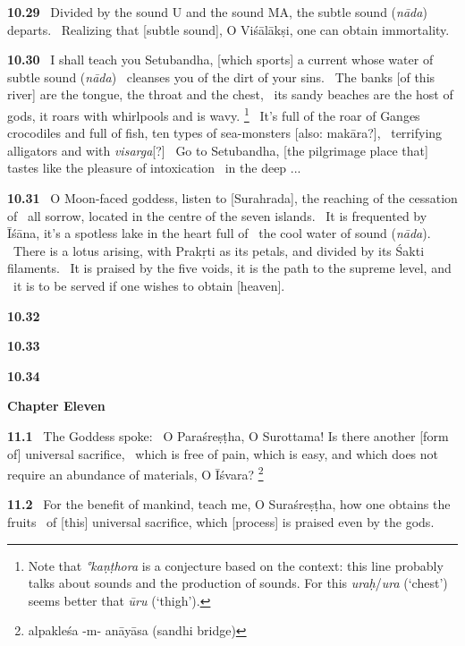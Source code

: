 \documentclass{article}
\newcommand{\skt}[1]{\textit{#1}}
\begin{document}
\textbf{10.29}%
\ Divided by the sound U and the sound MA, the subtle sound (\skt{nāda}) departs.%
\ Realizing that [subtle sound], O Viśālākṣi, one can obtain immortality.%


\textbf{10.30}%
\ I shall teach you Setubandha, [which sports] a current whose water of subtle sound (\skt{nāda})%
\                                 cleanses you of the dirt of your sins.%
\ The banks [of this river] are the tongue, the throat and the chest,%
\                         its sandy beaches are the host of gods, it roars with whirlpools and is wavy.%
\footnote{Note that \skt{°kaṇṭhora} is a conjecture based on the context: this line                        probably talks about sounds and the production of sounds. For this                         \skt{uraḥ}/\skt{ura} (`chest') seems better that \skt{ūru} (`thigh'). }%
\ It's full of the roar of Ganges crocodiles and full of fish, ten types of sea-monsters [also: makāra?],%
\                          terrifying alligators and with \skt{visarga}[?]%
\ Go to Setubandha, [the pilgrimage place that] tastes like the pleasure of intoxication%
\                         in the deep ...%


\textbf{10.31}%
\ O Moon-faced goddess, listen to [Surahrada], the reaching of the cessation of%
\                         all sorrow, located in the centre of the seven islands.%
\ It is frequented by Īśāna, it's a spotless lake in the heart full of%
\                         the cool water of sound (\skt{nāda}).%
\ There is a lotus arising, with Prakṛti as its petals, and divided by its Śakti filaments.%
\ It is praised by the five voids, it is the path to the supreme level, and%
\                         it is to be served if one wishes to obtain [heaven].%


\textbf{10.32}%


\textbf{10.33}%


\textbf{10.34}%
\vfill\pagebreak\begin{center}{\large\textbf{ Chapter Eleven 
}}\end{center}


\textbf{11.1}%
\ The Goddess spoke:%
\ O Paraśreṣṭha, O Surottama! Is there another [form of] universal sacrifice,%
\ which is free of pain, which is easy, and which does not require an abundance of materials, O Īśvara?%
\footnote{alpakleśa -m- anāyāsa (sandhi bridge) }%


\textbf{11.2}%
\ For the benefit of mankind, teach me, O Suraśreṣṭha, how one obtains the fruits%
\                      of [this] universal sacrifice, which [process] is praised even by the gods.%
\end{document}
